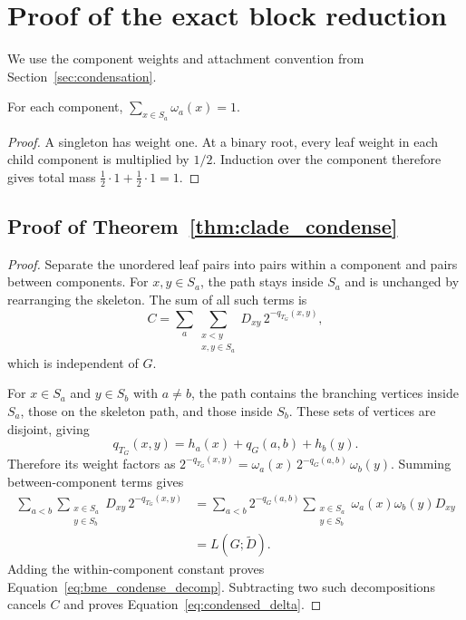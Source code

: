 \section{Proof of the exact block reduction}
\label{sec:block_proof}

We use the component weights and attachment convention from
Section~\ref{sec:condensation}.

\begin{lemma}
\label{lem:normalization}
For each component, $\sum_{x\in S_a}\omega_a(x)=1$.
\end{lemma}
\begin{proof}
A singleton has weight one.
At a binary root, every leaf weight in each child component is multiplied by $1/2$.
Induction over the component therefore gives total mass
$\tfrac12\cdot1+\tfrac12\cdot1=1$.
\end{proof}

\subsection{Proof of Theorem~\ref{thm:clade_condense}}

\begin{proof}
Separate the unordered leaf pairs into pairs within a component and pairs between components.
For $x,y\in S_a$, the path stays inside $S_a$ and is unchanged by rearranging the skeleton.
The sum of all such terms is
\[
 C=\sum_a\sum_{\substack{x<y\\x,y\in S_a}}
      D_{xy}\,2^{-q_{T_G}(x,y)},
\]
which is independent of $G$.

For $x\in S_a$ and $y\in S_b$ with $a\ne b$, the path contains the branching vertices inside $S_a$, those on the skeleton path, and those inside $S_b$.
These sets of vertices are disjoint, giving
\[
 q_{T_G}(x,y)=h_a(x)+q_G(a,b)+h_b(y).
\]
Therefore its weight factors as
$2^{-q_{T_G}(x,y)}=\omega_a(x)\,2^{-q_G(a,b)}\,\omega_b(y)$.
Summing between-component terms gives
\begin{align*}
 \sum_{a<b}\sum_{\substack{x\in S_a\\y\in S_b}}
 D_{xy}\,2^{-q_{T_G}(x,y)}
 &=\sum_{a<b}2^{-q_G(a,b)}
      \sum_{\substack{x\in S_a\\y\in S_b}}\omega_a(x)\omega_b(y)D_{xy}\\
 &=L(G;\widetilde D).
\end{align*}
Adding the within-component constant proves Equation~\eqref{eq:bme_condense_decomp}.
Subtracting two such decompositions cancels $C$ and proves Equation~\eqref{eq:condensed_delta}.
\end{proof}

